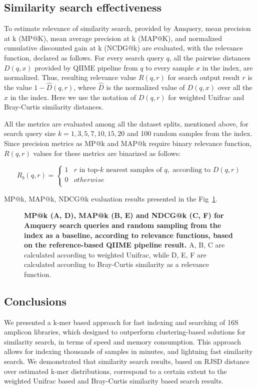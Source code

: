 \documentclass[10pt,letterpaper]{article}
\begin{document}
\subsection*{Similarity search effectiveness}
To estimate relevance of similarity search, provided by Amquery, mean precision at k (MP@K), mean average precision at k (MAP@K), and normalized cumulative discounted gain at k (NCDG@k) \cite{book, jarvelin2000ir, jarvelin2002cumulated}
are evaluated, with the relevance function, declared as follows. For every search query $q$, all the pairwise distances $D(q, x)$ provided by QIIME pipeline from $q$ to every sample $x$ in the index, are normalized. 
Thus, resulting relevance value $R(q, r)$ for search output result $r$ is the value $1 - \hat{D}(q, r)$, whree $\hat{D}$ is the normalized value of $D(q, x)$ over all the $x$ in the index. Here we use the notation of $D(q, r)$ for weighted Unifrac and Bray-Curtis similarity distances.

All the metrics are evaluated among all the dataset splits, mentioned above, for search query size $k = {1, 3, 5, 7, 10, 15, 20}$ and 100 random samples from the index. Since precision metrics as MP@k and MAP@k require binary relevance function,
$R(q, r)$ values for these metrics are binarized as follows:

\[ R_b(q, r)  =
  \begin{cases}
    1  & r \text{ in top-} k \text{ nearest samples of } q, \text{ according to } D(q, r)\\
    0  &  otherwise \\
  \end{cases}
\] 

MP@k, MAP@k, NDCG@k evaluation results presented in the Fig~\ref{fig5}.


\begin{figure}[!h]
\caption{{\bf MP@k (A, D), MAP@k (B, E) and NDCG@k (C, F) for Amquery search queries and random sampling from the index as a baseline, according to relevance functions, based on the reference-based QIIME pipeline result.}
A, B, C are calculated according to weighted Unifrac, while D, E, F are calculated according to Bray-Curtis similarity as a relevance function.}
\label{fig5}
\end{figure}


\subsection*{Conclusions}
We presented a k-mer based approach for fast indexing and searching of 16S amplicon libraries, which designed to outperform clustering-based solutions for similarity search, in terms of speed and memory consumption.
This approach allows for indexing thousands of samples in minutes, and lightning fast similarity search. We demonstrated that similarity search results, based on RJSD distance over estimated k-mer distributions, correspond to a certain extent to the weighted Unifrac based and Bray-Curtis similarity based search results.
\end{document}
